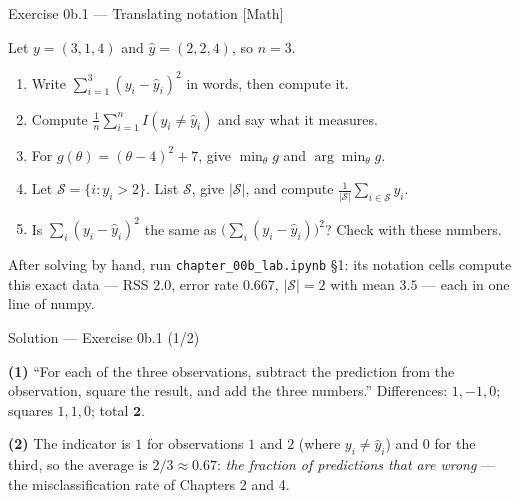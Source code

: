 \documentclass[aspectratio=169,11pt]{beamer}
\begin{document}
\begin{frame}{Exercise 0b.1 --- Translating notation [Math]}
  \begin{exercise}
    Let $y = (3, 1, 4)$ and $\hat y = (2, 2, 4)$, so $n = 3$.
    \begin{enumerate}
      \item Write $\sum_{i=1}^{3}(y_i - \hat y_i)^2$ in words, then compute it.
      \item Compute $\frac{1}{n}\sum_{i=1}^{n} I(y_i \ne \hat y_i)$ and say what
            it measures.
      \item For $g(\theta) = (\theta - 4)^2 + 7$, give $\min_\theta g$ and
            $\arg\min_\theta g$.
      \item Let $\mathcal{S} = \{i : y_i > 2\}$. List $\mathcal{S}$, give
            $|\mathcal{S}|$, and compute $\frac{1}{|\mathcal{S}|}\sum_{i \in \mathcal{S}} y_i$.
      \item Is $\sum_i (y_i - \hat y_i)^2$ the same as
            $\bigl(\sum_i (y_i - \hat y_i)\bigr)^2$? Check with these numbers.
    \end{enumerate}
  \end{exercise}
  \begin{labnote}
    After solving by hand, run \texttt{chapter\_00b\_lab.ipynb} \S1: its
    notation cells compute this exact data --- RSS $2.0$, error rate $0.667$,
    $|\mathcal{S}| = 2$ with mean $3.5$ --- each in one line of numpy.
  \end{labnote}
\end{frame}

\begin{frame}{Solution --- Exercise 0b.1 (1/2)}
  \begin{solutionbox}
    \textbf{(1)} ``For each of the three observations, subtract the prediction
    from the observation, square the result, and add the three numbers.''
    Differences: $1, -1, 0$; squares $1, 1, 0$; total $\mathbf{2}$.

    \textbf{(2)} The indicator is $1$ for observations $1$ and $2$ (where
    $y_i \neq \hat y_i$) and $0$ for the third, so the average is
    $2/3 \approx 0.67$: \emph{the fraction of predictions that are wrong} ---
    the misclassification rate of Chapters 2 and 4.
  \end{solutionbox}
\end{frame}
\end{document}
